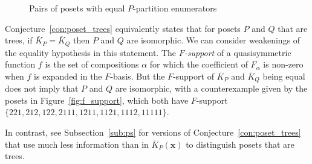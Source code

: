 \documentclass[ALCO,Unicode,published]{cedram}
\newcommand{\x}{\mathbf{x}}
\newcommand{\KK}[1]{\overline{K}_{#1}}
\begin{document}
\begin{remark}
\begin{figure}
\begin{center}
\end{center}
\caption{Pairs of posets with equal $P$-partition enumerators}
\label{fig:equal_kp}
\end{figure}

Conjecture~\ref{con:poset_trees} equivalently states that for posets $P$ and $Q$ that are trees, if $\KK{P} = \KK{Q}$ then $P$ and $Q$ are isomorphic.  We can consider weakenings of the equality hypothesis in this statement.  The \emph{$F$-support} of a quasisymmetric function $f$ is the set of compositions $\alpha$ for which the coefficient of $F_\alpha$ is non-zero when $f$ is expanded in the $F$-basis.  But the $F$-support of $\KK{P}$ and  $\KK{Q}$ being equal does not imply that $P$ and $Q$ are isomorphic, with a counterexample given by the posets in Figure~\ref{fig:f_support}, which both have $F$-support $\{221, 212, 122, 2111, 1211, 1121, 1112, 11111\}$.

In contrast, see Subsection~\ref{sub:ps} for versions of Conjecture~\ref{con:poset_trees} that use much less information than in $\KK{P}(\x)$ to distinguish posets that are trees.


\end{remark}
\end{document}
